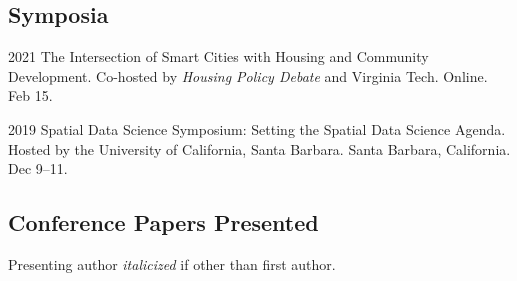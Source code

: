 \documentclass[12pt,letterpaper]{report}
\begin{document}
    \subsection*{Symposia}

    \begin{tablist}

        \item[2021] \tab The Intersection of Smart Cities with Housing and Community Development. Co-hosted by \textit{Housing Policy Debate} and Virginia Tech. Online. Feb 15.

        \item[2019] \tab Spatial Data Science Symposium: Setting the Spatial Data Science Agenda. Hosted by the University of California, Santa Barbara. Santa Barbara, California. Dec 9--11.

    \end{tablist}

    \subsection*{Conference Papers Presented}

    Presenting author \textit{italicized} if other than first author.\bigskip
\end{document}
